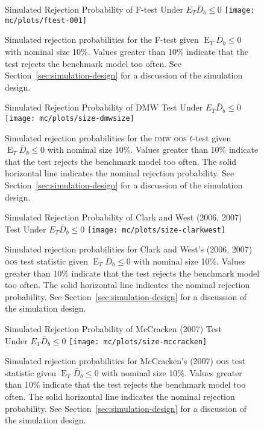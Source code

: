 \documentclass[11pt]{article}
\DeclareMathOperator{\E}{E}
\newcommand{\oosB}{\bar{D}_b}
\begin{document}
\begin{figure}
  \centering
\large{Simulated Rejection Probability of F-test Under $E_T
      \oosB \leq 0$}
  \texttt{[image: mc/plots/ftest-001]}
  \caption{Simulated rejection probabilities for the F-test given
    $\E_T \oosB \leq 0$ with nominal size 10\%.  Values greater than
    10\% indicate that the test rejects the benchmark model too often.
    See Section~\ref{sec:simulation-design} for a discussion of the
    simulation design.}
  \label{fig:ftest}
\end{figure}
\clearpage
\begin{figure}
  \centering
  \large{Simulated Rejection Probability of DMW Test Under $E_T
      \oosB \leq 0$}
  \texttt{[image: mc/plots/size-dmwsize]}  
  \caption{Simulated rejection probabilities for the \protect\textsc{dmw}
    \protect\textsc{oos} $t$-test given $\E_T \oosB \leq 0$ with nominal
    size 10\%.  Values greater than 10\% indicate that the test
    rejects the benchmark model too often.  The solid horizontal line
    indicates the nominal rejection probability.  See
    Section~\ref{sec:simulation-design} for a discussion of the
    simulation design.}
  \label{fig:ttest-size}
\end{figure}

\begin{figure}
  \centering
  \large{Simulated Rejection Probability of Clark and West
      (2006, 2007) Test Under $E_T \oosB \leq 0$}
  \texttt{[image: mc/plots/size-clarkwest]}
  \caption{Simulated rejection probabilities for Clark and West's
    (2006, 2007) \protect\textsc{oos} test statistic given $\E_T \oosB
    \leq 0$ with nominal size 10\%.  Values greater than 10\% indicate
    that the test rejects the benchmark model too often.  The solid
    horizontal line indicates the nominal rejection probability.  See
    Section~\ref{sec:simulation-design} for a discussion of the
    simulation design.}
   \label{fig:clarkwest}
\end{figure}

\begin{figure}
  \centering
  \large{Simulated Rejection Probability of McCracken (2007)
      Test \\ Under $E_T \oosB \leq 0$}
  \texttt{[image: mc/plots/size-mccracken]}
  \caption{Simulated rejection probabilities for McCracken's (2007)
    \protect \textsc{oos} test statistic given $\E_T \oosB \leq 0$ with
    nominal size 10\%.  Values greater than 10\% indicate that the
    test rejects the benchmark model too often.  The solid horizontal
    line indicates the nominal rejection probability.  See
    Section~\ref{sec:simulation-design} for a discussion of the
    simulation design.}
  \label{fig:mccracken}
\end{figure}
\end{document}
